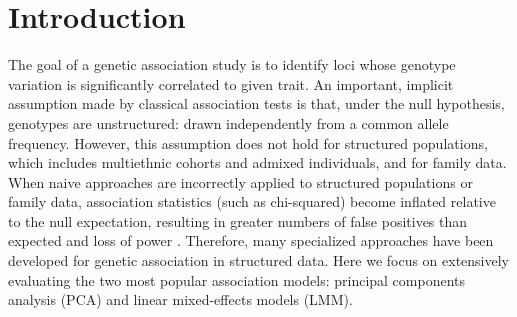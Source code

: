 \documentclass[11pt]{article}
\begin{document}



\section{Introduction} 

The goal of a genetic association study is to identify loci whose genotype variation is significantly correlated to given trait.
An important, implicit assumption made by classical association tests is that, under the null hypothesis, genotypes are unstructured: drawn independently from a common allele frequency.
However, this assumption does not hold for structured populations, which includes multiethnic cohorts and admixed individuals, and for family data.
When naive approaches are incorrectly applied to structured populations or family data, association statistics (such as chi-squared) become inflated relative to the null expectation, resulting in greater numbers of false positives than expected and loss of power \citep{devlin_genomic_1999, voight_confounding_2005, astle_population_2009}.
Therefore, many specialized approaches have been developed for genetic association in structured data.
Here we focus on extensively evaluating the two most popular association models: principal components analysis (PCA) and linear mixed-effects models (LMM).
\end{document}
